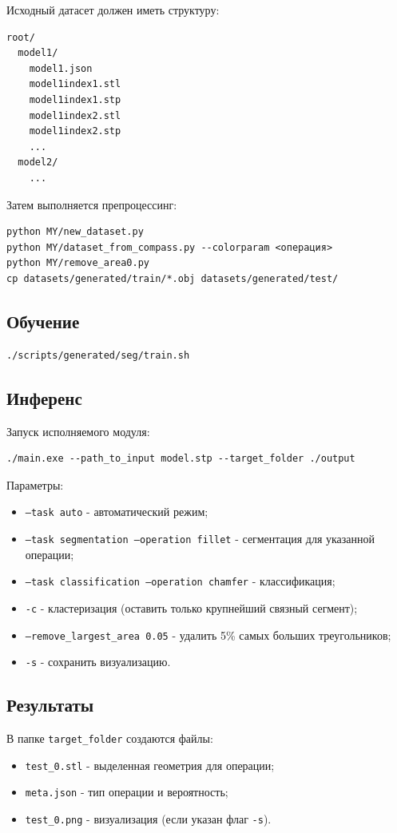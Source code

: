 Исходный датасет должен иметь структуру:

\begin{verbatim}
root/
  model1/
    model1.json
    model1index1.stl
    model1index1.stp
    model1index2.stl
    model1index2.stp
    ...
  model2/
    ...
\end{verbatim}

Затем выполняется препроцессинг:

\begin{verbatim}
python MY/new_dataset.py
python MY/dataset_from_compass.py --colorparam <операция>
python MY/remove_area0.py
cp datasets/generated/train/*.obj datasets/generated/test/
\end{verbatim}

\subsection{Обучение}

\begin{verbatim}
./scripts/generated/seg/train.sh
\end{verbatim}

\subsection{Инференс}

Запуск исполняемого модуля:

\begin{verbatim}
./main.exe --path_to_input model.stp --target_folder ./output
\end{verbatim}

Параметры:
\begin{itemize}
    \item \texttt{--task auto} - автоматический режим;
    \item \texttt{--task segmentation --operation fillet} - сегментация для указанной операции;
    \item \texttt{--task classification --operation chamfer} - классификация;
    \item \texttt{-c} - кластеризация (оставить только крупнейший связный сегмент);
    \item \texttt{--remove\_largest\_area 0.05} - удалить 5\% самых больших треугольников;
    \item \texttt{-s} - сохранить визуализацию.
\end{itemize}

\subsection{Результаты}

В папке \texttt{target\_folder} создаются файлы:
\begin{itemize}
    \item \texttt{test\_0.stl} - выделенная геометрия для операции;
    \item \texttt{meta.json} - тип операции и вероятность;
    \item \texttt{test\_0.png} - визуализация (если указан флаг \texttt{-s}).
\end{itemize}

